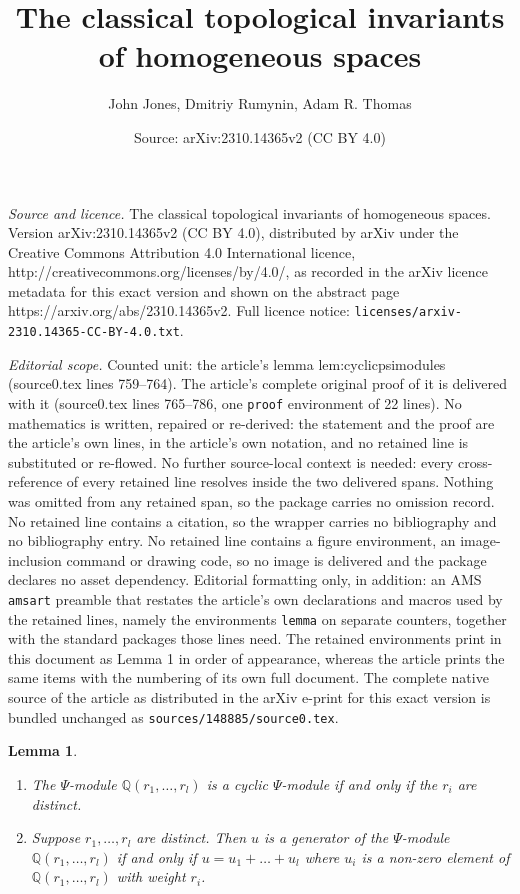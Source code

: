 \documentclass[10pt,a4paper]{amsart}
\title{The classical topological invariants of homogeneous spaces}
\author{John Jones, Dmitriy Rumynin, Adam R. Thomas}
\date{Source: arXiv:2310.14365v2 (CC BY 4.0)}
\newtheorem{lemma}{Lemma}
\newcommand{\Q}{\mathbb{Q}}
\begin{document}
\maketitle

\noindent\emph{Source and licence.} The classical topological invariants of homogeneous spaces. Version arXiv:2310.14365v2 (CC BY 4.0), distributed by arXiv under the Creative Commons Attribution 4.0 International licence, http://creativecommons.org/licenses/by/4.0/, as recorded in the arXiv licence metadata for this exact version and shown on the abstract page https://arxiv.org/abs/2310.14365v2. Full licence notice: \texttt{licenses/arxiv-2310.14365-CC-BY-4.0.txt}.\par\smallskip

\noindent\textit{Editorial scope.} Counted unit: the article's lemma lem:cyclicpsimodules (source0.tex lines 759--764). The article's complete original proof of it is delivered with it (source0.tex lines 765--786, one \texttt{proof} environment of 22 lines). No mathematics is written, repaired or re-derived: the statement and the proof are the article's own lines, in the article's own notation, and no retained line is substituted or re-flowed.  No further source-local context is needed: every cross-reference of every retained line resolves inside the two delivered spans.  Nothing was omitted from any retained span, so the package carries no omission record.  No retained line contains a citation, so the wrapper carries no bibliography and no bibliography entry.  No retained line contains a figure environment, an image-inclusion command or drawing code, so no image is delivered and the package declares no asset dependency.  Editorial formatting only, in addition: an AMS \texttt{amsart} preamble that restates the article's own declarations and macros used by the retained lines, namely the environments \texttt{lemma} on separate counters, together with the standard packages those lines need.  The retained environments print in this document as Lemma 1 in order of appearance, whereas the article prints the same items with the numbering of its own full document.  The complete native source of the article as distributed in the arXiv e-print for this exact version is bundled unchanged as \texttt{sources/148885/source0.tex}.
\begin{lemma} \label{lem:cyclicpsimodules}
\begin{enumerate}
\item The $\Psi$-module $\Q(r_1, \dots, r_l)$ is a cyclic $\Psi$-module if and only if the $r_i$ are distinct.
\item Suppose $r_1, \dots, r_l$ are distinct. Then $u$ is a generator of the $\Psi$-module $\Q(r_1, \dots, r_l)$ if and only if $u = u_1 + \dots + u_l$ where $u_i$ is a non-zero element of $\Q(r_1, \dots, r_l)$ with weight $r_i$.
\end{enumerate}
\end{lemma}
\end{document}
